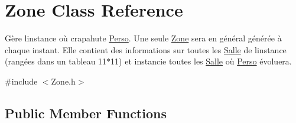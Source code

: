 \hypertarget{classZone}{}\section{Zone Class Reference}
\label{classZone}


Gère l\textquotesingle{}instance où crapahute \hyperlink{classPerso}{Perso}. Une seule \hyperlink{classZone}{Zone} sera en général générée à chaque instant. Elle contient des informations sur toutes les \hyperlink{classSalle}{Salle} de l\textquotesingle{}instance (rangées dans un tableau 11$\ast$11) et instancie toutes les \hyperlink{classSalle}{Salle} où \hyperlink{classPerso}{Perso} évoluera.  




{\ttfamily \#include $<$Zone.\+h$>$}

\subsection*{Public Member Functions}
